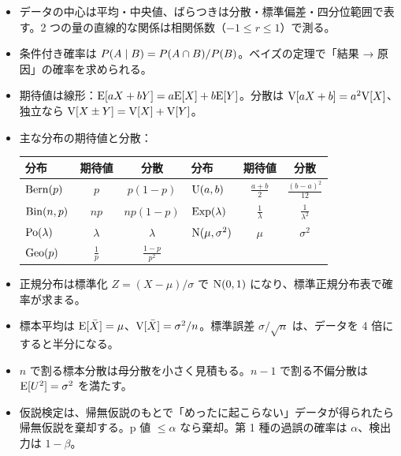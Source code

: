 \begin{chaptersummary}
  \begin{itemize}
    \item データの中心は平均・中央値、ばらつきは分散・標準偏差・四分位範囲で表す。2 つの量の直線的な関係は相関係数（$-1 \le r \le 1$）で測る。
    \item 条件付き確率は $P(A \mid B) = P(A \cap B)/P(B)$。ベイズの定理で「結果 → 原因」の確率を求められる。
    \item 期待値は線形：$\mathrm{E}[aX + bY] = a\mathrm{E}[X] + b\mathrm{E}[Y]$。分散は $\mathrm{V}[aX + b] = a^2\mathrm{V}[X]$、独立なら $\mathrm{V}[X \pm Y] = \mathrm{V}[X] + \mathrm{V}[Y]$。
    \item 主な分布の期待値と分散：
      \begin{center}
        \small
        \begin{tabular}{lcc|lcc}
          \toprule
          分布 & 期待値 & 分散 & 分布 & 期待値 & 分散 \\
          \midrule
          $\mathrm{Bern}(p)$ & $p$ & $p(1-p)$ & $\mathrm{U}(a, b)$ & $\frac{a+b}{2}$ & $\frac{(b-a)^2}{12}$ \\[1mm]
          $\mathrm{Bin}(n, p)$ & $np$ & $np(1-p)$ & $\mathrm{Exp}(\lambda)$ & $\frac{1}{\lambda}$ & $\frac{1}{\lambda^2}$ \\[1mm]
          $\mathrm{Po}(\lambda)$ & $\lambda$ & $\lambda$ & $\mathrm{N}(\mu, \sigma^2)$ & $\mu$ & $\sigma^2$ \\[1mm]
          $\mathrm{Geo}(p)$ & $\frac{1}{p}$ & $\frac{1-p}{p^2}$ & & & \\
          \bottomrule
        \end{tabular}
      \end{center}
    \item 正規分布は標準化 $Z = (X - \mu)/\sigma$ で $\mathrm{N}(0, 1)$ になり、標準正規分布表で確率が求まる。
    \item 標本平均は $\mathrm{E}[\bar{X}] = \mu$、$\mathrm{V}[\bar{X}] = \sigma^2/n$。標準誤差 $\sigma/\sqrt{n}$ は、データを 4 倍にすると半分になる。
    \item $n$ で割る標本分散は母分散を小さく見積もる。$n - 1$ で割る不偏分散は $\mathrm{E}[U^2] = \sigma^2$ を満たす。
    \item 仮説検定は、帰無仮説のもとで「めったに起こらない」データが得られたら帰無仮説を棄却する。p 値 $\le \alpha$ なら棄却。第 1 種の過誤の確率は $\alpha$、検出力は $1 - \beta$。
  \end{itemize}
\end{chaptersummary}
